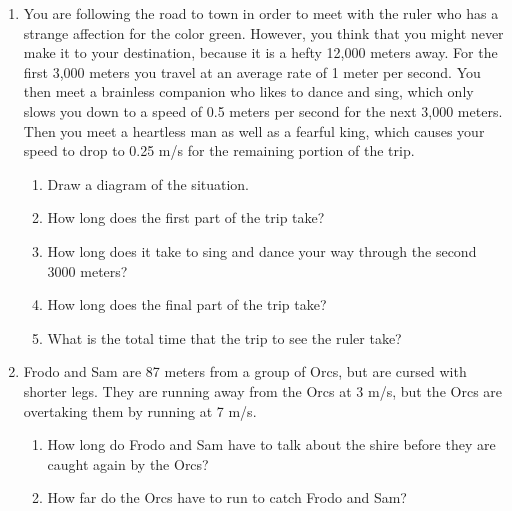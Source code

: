 \documentclass[letterpaper, 12pt]{article}
\begin{document}
\begin{enumerate}
\vspace{2.95in}
\item You are following the road to town in order to meet with the ruler who has a strange affection for the color green.  However, you think that you might never make it to your destination, because it is a hefty 12,000 meters away.  For the first 3,000 meters you travel at an average rate of 1 meter per second.  You then meet a brainless companion who likes to dance and sing, which only  slows you down to a speed of 0.5 meters per second for the next 3,000 meters.  Then you meet a heartless man as well as a fearful king, which causes your speed to drop to 0.25 m/s for the remaining portion of the trip.  
\begin{enumerate} \item Draw a diagram of the situation.
	\vspace{0.65in}
	\item How long does the first part of the trip take?
	\vspace{0.65in}
	\item How long does it take to sing and dance your way through the second 3000 meters? 
	\vspace{0.65in}
	\item How long does the final part of the trip take?
	\vspace{0.65in}
	\item What is the total time that the trip to see the ruler take?
\end{enumerate}
\vspace{0.65in}
\item Frodo and Sam are 87 meters from a group of Orcs, but are cursed with shorter legs. They are running away from the Orcs at 3 m/s, but the Orcs are overtaking them by running at 7 m/s.  
\begin{enumerate}
\item How long do Frodo and Sam have to talk about the shire before they are caught again by the Orcs?
\vspace{0.65in}
\item How far do the Orcs have to run to catch Frodo and Sam?
\end{enumerate}

	
\end{enumerate}
 
\end{document}
